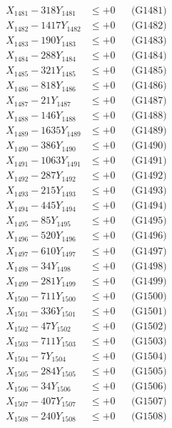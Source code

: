 \documentclass[a4paper,10pt]{article}
\begin{document}
{\begin{align}
\allowbreak
X_{1481} - 318Y_{1481} &\leq +0 && \text{(G1481)} \\
X_{1482} - 1417Y_{1482} &\leq +0 && \text{(G1482)} \\
X_{1483} - 190Y_{1483} &\leq +0 && \text{(G1483)} \\
X_{1484} - 288Y_{1484} &\leq +0 && \text{(G1484)} \\
X_{1485} - 321Y_{1485} &\leq +0 && \text{(G1485)} \\
X_{1486} - 818Y_{1486} &\leq +0 && \text{(G1486)} \\
X_{1487} - 21Y_{1487} &\leq +0 && \text{(G1487)} \\
X_{1488} - 146Y_{1488} &\leq +0 && \text{(G1488)} \\
X_{1489} - 1635Y_{1489} &\leq +0 && \text{(G1489)} \\
X_{1490} - 386Y_{1490} &\leq +0 && \text{(G1490)} \\
\allowbreak
X_{1491} - 1063Y_{1491} &\leq +0 && \text{(G1491)} \\
X_{1492} - 287Y_{1492} &\leq +0 && \text{(G1492)} \\
X_{1493} - 215Y_{1493} &\leq +0 && \text{(G1493)} \\
X_{1494} - 445Y_{1494} &\leq +0 && \text{(G1494)} \\
X_{1495} - 85Y_{1495} &\leq +0 && \text{(G1495)} \\
X_{1496} - 520Y_{1496} &\leq +0 && \text{(G1496)} \\
X_{1497} - 610Y_{1497} &\leq +0 && \text{(G1497)} \\
X_{1498} - 34Y_{1498} &\leq +0 && \text{(G1498)} \\
X_{1499} - 281Y_{1499} &\leq +0 && \text{(G1499)} \\
X_{1500} - 711Y_{1500} &\leq +0 && \text{(G1500)} \\
\allowbreak
X_{1501} - 336Y_{1501} &\leq +0 && \text{(G1501)} \\
X_{1502} - 47Y_{1502} &\leq +0 && \text{(G1502)} \\
X_{1503} - 711Y_{1503} &\leq +0 && \text{(G1503)} \\
X_{1504} - 7Y_{1504} &\leq +0 && \text{(G1504)} \\
X_{1505} - 284Y_{1505} &\leq +0 && \text{(G1505)} \\
X_{1506} - 34Y_{1506} &\leq +0 && \text{(G1506)} \\
X_{1507} - 407Y_{1507} &\leq +0 && \text{(G1507)} \\
X_{1508} - 240Y_{1508} &\leq +0 && \text{(G1508)} \\

\end{align}}
\end{document}
